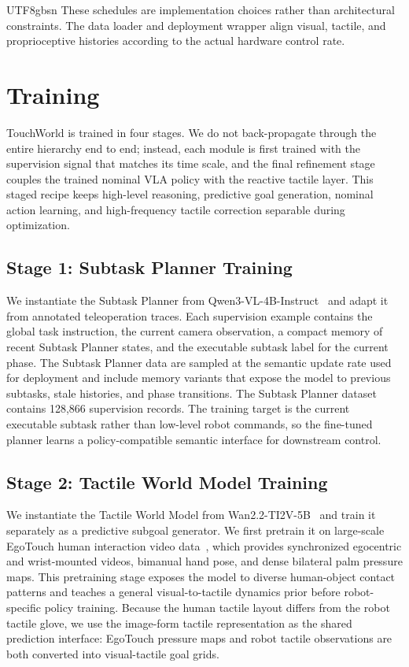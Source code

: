 \documentclass[]{mpai_report}
\begin{document}
\begin{CJK*}{UTF8}{gbsn}
These schedules are implementation choices rather than architectural constraints.
The data loader and deployment wrapper align visual, tactile, and proprioceptive histories according to the actual hardware control rate.

\section{Training}
\label{sec:training}

TouchWorld is trained in four stages.
We do not back-propagate through the entire hierarchy end to end; instead, each module is first trained with the supervision signal that matches its time scale, and the final refinement stage couples the trained nominal VLA policy with the reactive tactile layer.
This staged recipe keeps high-level reasoning, predictive goal generation, nominal action learning, and high-frequency tactile correction separable during optimization.

\subsection{Stage 1: Subtask Planner Training}

We instantiate the Subtask Planner from Qwen3-VL-4B-Instruct~\cite{yang2025qwen3technicalreport} and adapt it from annotated teleoperation traces.
Each supervision example contains the global task instruction, the current camera observation, a compact memory of recent Subtask Planner states, and the executable subtask label for the current phase.
The Subtask Planner data are sampled at the semantic update rate used for deployment and include memory variants that expose the model to previous subtasks, stale histories, and phase transitions.
The Subtask Planner dataset contains 128,866 supervision records.
The training target is the current executable subtask rather than low-level robot commands, so the fine-tuned planner learns a policy-compatible semantic interface for downstream control.

\subsection{Stage 2: Tactile World Model Training}

We instantiate the Tactile World Model from Wan2.2-TI2V-5B~\cite{wan2025wanopenadvancedlargescale} and train it separately as a predictive subgoal generator.
We first pretrain it on large-scale EgoTouch human interaction video data~\cite{zhou2026touchanythingdatasetframeworkbimanual}, which provides synchronized egocentric and wrist-mounted videos, bimanual hand pose, and dense bilateral palm pressure maps.
This pretraining stage exposes the model to diverse human-object contact patterns and teaches a general visual-to-tactile dynamics prior before robot-specific policy training.
Because the human tactile layout differs from the robot tactile glove, we use the image-form tactile representation as the shared prediction interface: EgoTouch pressure maps and robot tactile observations are both converted into visual-tactile goal grids.


\end{CJK*}
\end{document}
